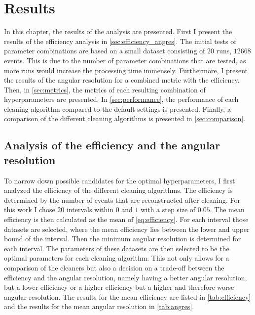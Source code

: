 \chapter{Results}
\label{ch:results}

In this chapter, the results of the analysis are presented. First I present the results of the
efficiency analysis in \autoref{sec:efficiency_angres}. The initial tests of parameter combinations
are based on a small dataset consisting of \(\num{20}\) runs, \ie \(\num{12668}\) events. This is
due to the number of parameter combinations that are tested, as more runs would increase the
processing time immensely. Furthermore, I present the results of the angular resolution for a combined
metric with the efficiency. Then, in \autoref{sec:metrics}, the metrics of each resulting combination
of hyperparameters are presented. In \autoref{sec:performance}, the performance of each cleaning
algorithm compared to the default settings is presented. Finally, a comparison of the different
cleaning algorithms is presented in \autoref{sec:comparison}.


\section{Analysis of the efficiency and the angular resolution}
\label{sec:efficiency_angres}

To narrow down possible candidates for the optimal hyperparameters, I first analyzed the efficiency
of the different cleaning algorithms. The efficiency is determined by the number of events that are
reconstructed after cleaning. For this work I chose \(\num{20}\) intervals within \(\num{0}\) and
\(\num{1}\) with a step size of \(\num{0.05}\). The mean efficiency is then calculated as the mean
of \autoref{eq:efficiency}. For each interval those datasets are selected, where the mean efficiency
lies between the lower and upper bound of the interval. Then the minimum angular resolution is
determined for each interval. The parameters of these datasets are then selected to be the optimal
parameters for each cleaning algorithm. This not only allows for a comparison of the cleaners but also
a decision on a trade-off between the efficiency and the angular resolution, namely having a better
angular resolution, but a lower efficiency or a higher efficiency but a higher and therefore worse
angular resolution. The results for the mean efficiency are listed in \autoref{tab:efficiency} and
the results for the mean angular resolution in \autoref{tab:angres}.

